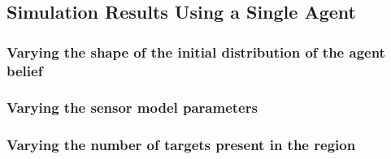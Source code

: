 \subsection{Simulation Results Using a Single Agent}\label{subsec:SingleAgentSingleSourceResults}

\subsubsection{Varying the shape of the initial distribution of the agent belief}\label{subsubsec:VaryingPrior}


\subsubsection{Varying the sensor model parameters}\label{subsubsec:MicalibratedSensor}


\subsubsection{Varying the number of targets present in the region}\label{subsubsec:VaryingNoTargets}



